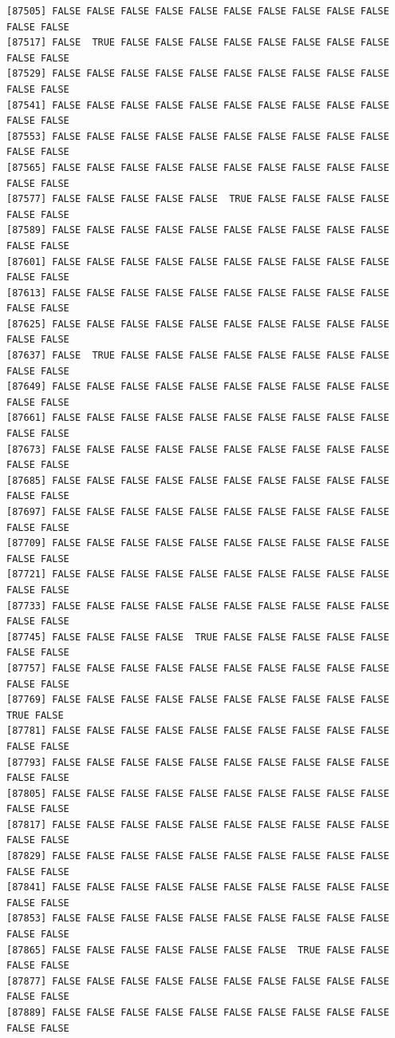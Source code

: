 \documentclass[
  a4paper,
  DIV=11,
  numbers=noendperiod]{scrartcl}
\begin{document}
\begin{verbatim}
[87505] FALSE FALSE FALSE FALSE FALSE FALSE FALSE FALSE FALSE FALSE FALSE FALSE
[87517] FALSE  TRUE FALSE FALSE FALSE FALSE FALSE FALSE FALSE FALSE FALSE FALSE
[87529] FALSE FALSE FALSE FALSE FALSE FALSE FALSE FALSE FALSE FALSE FALSE FALSE
[87541] FALSE FALSE FALSE FALSE FALSE FALSE FALSE FALSE FALSE FALSE FALSE FALSE
[87553] FALSE FALSE FALSE FALSE FALSE FALSE FALSE FALSE FALSE FALSE FALSE FALSE
[87565] FALSE FALSE FALSE FALSE FALSE FALSE FALSE FALSE FALSE FALSE FALSE FALSE
[87577] FALSE FALSE FALSE FALSE FALSE  TRUE FALSE FALSE FALSE FALSE FALSE FALSE
[87589] FALSE FALSE FALSE FALSE FALSE FALSE FALSE FALSE FALSE FALSE FALSE FALSE
[87601] FALSE FALSE FALSE FALSE FALSE FALSE FALSE FALSE FALSE FALSE FALSE FALSE
[87613] FALSE FALSE FALSE FALSE FALSE FALSE FALSE FALSE FALSE FALSE FALSE FALSE
[87625] FALSE FALSE FALSE FALSE FALSE FALSE FALSE FALSE FALSE FALSE FALSE FALSE
[87637] FALSE  TRUE FALSE FALSE FALSE FALSE FALSE FALSE FALSE FALSE FALSE FALSE
[87649] FALSE FALSE FALSE FALSE FALSE FALSE FALSE FALSE FALSE FALSE FALSE FALSE
[87661] FALSE FALSE FALSE FALSE FALSE FALSE FALSE FALSE FALSE FALSE FALSE FALSE
[87673] FALSE FALSE FALSE FALSE FALSE FALSE FALSE FALSE FALSE FALSE FALSE FALSE
[87685] FALSE FALSE FALSE FALSE FALSE FALSE FALSE FALSE FALSE FALSE FALSE FALSE
[87697] FALSE FALSE FALSE FALSE FALSE FALSE FALSE FALSE FALSE FALSE FALSE FALSE
[87709] FALSE FALSE FALSE FALSE FALSE FALSE FALSE FALSE FALSE FALSE FALSE FALSE
[87721] FALSE FALSE FALSE FALSE FALSE FALSE FALSE FALSE FALSE FALSE FALSE FALSE
[87733] FALSE FALSE FALSE FALSE FALSE FALSE FALSE FALSE FALSE FALSE FALSE FALSE
[87745] FALSE FALSE FALSE FALSE  TRUE FALSE FALSE FALSE FALSE FALSE FALSE FALSE
[87757] FALSE FALSE FALSE FALSE FALSE FALSE FALSE FALSE FALSE FALSE FALSE FALSE
[87769] FALSE FALSE FALSE FALSE FALSE FALSE FALSE FALSE FALSE FALSE  TRUE FALSE
[87781] FALSE FALSE FALSE FALSE FALSE FALSE FALSE FALSE FALSE FALSE FALSE FALSE
[87793] FALSE FALSE FALSE FALSE FALSE FALSE FALSE FALSE FALSE FALSE FALSE FALSE
[87805] FALSE FALSE FALSE FALSE FALSE FALSE FALSE FALSE FALSE FALSE FALSE FALSE
[87817] FALSE FALSE FALSE FALSE FALSE FALSE FALSE FALSE FALSE FALSE FALSE FALSE
[87829] FALSE FALSE FALSE FALSE FALSE FALSE FALSE FALSE FALSE FALSE FALSE FALSE
[87841] FALSE FALSE FALSE FALSE FALSE FALSE FALSE FALSE FALSE FALSE FALSE FALSE
[87853] FALSE FALSE FALSE FALSE FALSE FALSE FALSE FALSE FALSE FALSE FALSE FALSE
[87865] FALSE FALSE FALSE FALSE FALSE FALSE FALSE  TRUE FALSE FALSE FALSE FALSE
[87877] FALSE FALSE FALSE FALSE FALSE FALSE FALSE FALSE FALSE FALSE FALSE FALSE
[87889] FALSE FALSE FALSE FALSE FALSE FALSE FALSE FALSE FALSE FALSE FALSE FALSE

\end{verbatim}
\end{document}
